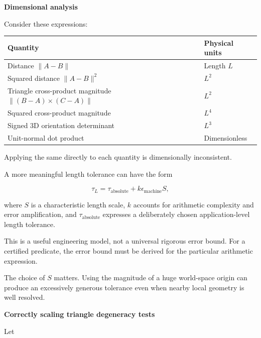 \textbf{Dimensional analysis}

Consider these expressions:

{\def\LTcaptype{none} %
\begin{longtable}[]{@{}
  >{\raggedright\arraybackslash}p{}
  >{\raggedright\arraybackslash}p{}@{}}
\toprule\noalign{}
\begin{minipage}[b]{\linewidth}\raggedright
Quantity
\end{minipage} & \begin{minipage}[b]{\linewidth}\raggedright
Physical units
\end{minipage} \\
\midrule\noalign{}
\endhead
\bottomrule\noalign{}
\endlastfoot
Distance \(\|A-B\|\) & Length \(L\) \\
Squared distance \(\|A-B\|^2\) & \(L^2\) \\
Triangle cross-product magnitude \(\|(B-A)\times(C-A)\|\) & \(L^2\) \\
Squared cross-product magnitude & \(L^4\) \\
Signed 3D orientation determinant & \(L^3\) \\
Unit-normal dot product & Dimensionless \\
\end{longtable}
}

Applying the same  directly to each quantity is dimensionally inconsistent.

A more meaningful length tolerance can have the form

\[
\tau_L=\tau_{\text{absolute}}+ k\epsilon_{\text{machine}}S,
\]

where \(S\) is a characteristic length scale, \(k\) accounts for arithmetic complexity and error amplification, and \(\tau_{\text{absolute}}\) expresses a deliberately chosen application-level length tolerance.

This is a useful engineering model, not a universal rigorous error bound. For a certified predicate, the error bound must be derived for the particular arithmetic expression.

The choice of \(S\) matters. Using the magnitude of a huge world-space origin can produce an excessively generous tolerance even when nearby local geometry is well resolved.

\textbf{Correctly scaling triangle degeneracy tests}

Let

